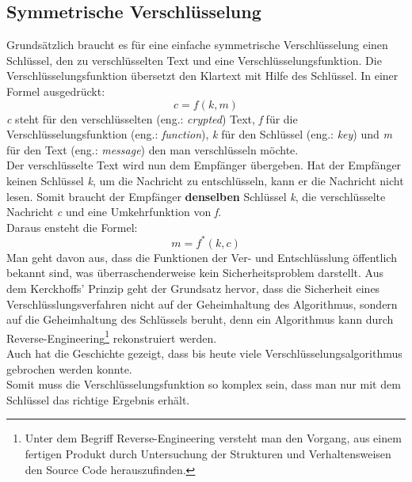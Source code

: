 \subsection{Symmetrische Verschlüsselung}
Grundsätzlich braucht es für eine einfache symmetrische Verschlüsselung einen Schlüssel, den zu verschlüsselten Text und eine Verschlüsselungsfunktion.
Die Verschlüsselungsfunktion übersetzt den Klartext mit Hilfe des Schlüssel. In einer Formel ausgedrückt:
\begin{equation*}
  c = f ( k, m )
\label{eqn:sym_versch}
\end{equation*}
\textit{c} steht für den verschlüsselten  (eng.: \textit{crypted}) Text, \textit{f} für die Verschlüsselungsfunktion (eng.: \textit{function}), \textit{k} für den Schlüssel (eng.: \textit{key}) und \textit{m} für den Text (eng.: \textit{message}) den man verschlüsseln möchte.\\
%
Der verschlüsselte Text wird nun dem Empfänger übergeben. Hat der Empfänger keinen Schlüssel \textit{k}, um die Nachricht zu entschlüsseln, kann er die Nachricht nicht lesen. Somit braucht der Empfänger \textbf{denselben} Schlüssel \textit{k}, die verschlüsselte Nachricht \textit{c} und eine Umkehrfunktion von \textit{f}.\\
Daraus ensteht die Formel:
\begin{equation*}
  m = f^*(k ,c)
\label{eqn:sym_entsch}
\end{equation*}
Man geht davon aus, dass die Funktionen der Ver- und Entschlüsslung öffentlich bekannt sind, was überraschenderweise kein Sicherheitsproblem darstellt. Aus dem Kerckhoffs' Prinzip geht der Grundsatz hervor, dass die Sicherheit eines Verschlüsslungsverfahren nicht auf der Geheimhaltung des Algorithmus, sondern auf die Geheimhaltung des Schlüssels beruht, denn ein Algorithmus kann durch Reverse-Engineering\footnote{Unter dem Begriff Reverse-Engineering versteht man den Vorgang, aus einem fertigen Produkt durch Untersuchung der Strukturen und Verhaltensweisen den Source Code herauszufinden.} rekonstruiert werden.\\
Auch hat die Geschichte gezeigt, dass bis heute viele Verschlüsselungsalgorithmus gebrochen werden konnte. \cite{mod_kry}\\
%
Somit muss die Verschlüsselungsfunktion so komplex sein, dass man nur mit dem Schlüssel das richtige Ergebnis erhält.
%
